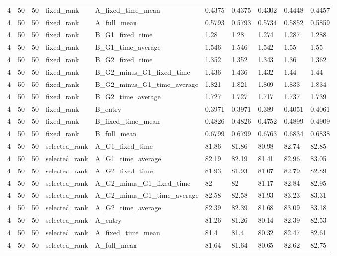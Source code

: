 \begin{longtable}{llllllllll}
4 & 50 & 50 & fixed\_rank & A\_fixed\_time\_mean & 0.4375 & 0.4375 & 0.4302 & 0.4448 & 0.4457 \\
4 & 50 & 50 & fixed\_rank & A\_full\_mean & 0.5793 & 0.5793 & 0.5734 & 0.5852 & 0.5859 \\
4 & 50 & 50 & fixed\_rank & B\_G1\_fixed\_time & 1.28 & 1.28 & 1.274 & 1.287 & 1.288 \\
4 & 50 & 50 & fixed\_rank & B\_G1\_time\_average & 1.546 & 1.546 & 1.542 & 1.55 & 1.55 \\
4 & 50 & 50 & fixed\_rank & B\_G2\_fixed\_time & 1.352 & 1.352 & 1.343 & 1.36 & 1.362 \\
4 & 50 & 50 & fixed\_rank & B\_G2\_minus\_G1\_fixed\_time & 1.436 & 1.436 & 1.432 & 1.44 & 1.44 \\
4 & 50 & 50 & fixed\_rank & B\_G2\_minus\_G1\_time\_average & 1.821 & 1.821 & 1.809 & 1.833 & 1.834 \\
4 & 50 & 50 & fixed\_rank & B\_G2\_time\_average & 1.727 & 1.727 & 1.717 & 1.737 & 1.739 \\
4 & 50 & 50 & fixed\_rank & B\_entry & 0.3971 & 0.3971 & 0.389 & 0.4051 & 0.4061 \\
4 & 50 & 50 & fixed\_rank & B\_fixed\_time\_mean & 0.4826 & 0.4826 & 0.4752 & 0.4899 & 0.4909 \\
4 & 50 & 50 & fixed\_rank & B\_full\_mean & 0.6799 & 0.6799 & 0.6763 & 0.6834 & 0.6838 \\
4 & 50 & 50 & selected\_rank & A\_G1\_fixed\_time & 81.86 & 81.86 & 80.98 & 82.74 & 82.85 \\
4 & 50 & 50 & selected\_rank & A\_G1\_time\_average & 82.19 & 82.19 & 81.41 & 82.96 & 83.05 \\
4 & 50 & 50 & selected\_rank & A\_G2\_fixed\_time & 81.93 & 81.93 & 81.07 & 82.79 & 82.89 \\
4 & 50 & 50 & selected\_rank & A\_G2\_minus\_G1\_fixed\_time & 82 & 82 & 81.17 & 82.84 & 82.95 \\
4 & 50 & 50 & selected\_rank & A\_G2\_minus\_G1\_time\_average & 82.58 & 82.58 & 81.93 & 83.23 & 83.31 \\
4 & 50 & 50 & selected\_rank & A\_G2\_time\_average & 82.39 & 82.39 & 81.68 & 83.09 & 83.18 \\
4 & 50 & 50 & selected\_rank & A\_entry & 81.26 & 81.26 & 80.14 & 82.39 & 82.53 \\
4 & 50 & 50 & selected\_rank & A\_fixed\_time\_mean & 81.4 & 81.4 & 80.32 & 82.47 & 82.61 \\
4 & 50 & 50 & selected\_rank & A\_full\_mean & 81.64 & 81.64 & 80.65 & 82.62 & 82.75 \\

\end{longtable}
